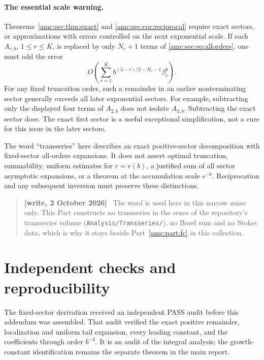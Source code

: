 \documentclass[11pt,letterpaper]{article}
\theoremstyle{remark}\newtheorem{remark}[theorem]{Remark}
\newenvironment{writenote}{\par\smallskip\begin{quote}\small\textbf{[write, 2 October 2026]}\ }{\end{quote}\smallskip}
\newcommand{\repopath}[1]{\nolinkurl{#1}}
\begin{document}
\paragraph{The essential scale warning.}
Theorems~\ref{amc:sec:thm:exact} and \ref{amc:sec:cor:reciprocal} require exact sectors, or approximations with errors controlled on the next exponential scale. If each $A_{r,b}$, $1\le r\le K$, is replaced by only $N_r+1$ terms of \eqref{amc:sec:eq:allorders}, one must add the error
\begin{equation}\label{amc:sec:eq:truncation}
 O\!\left(\sum_{r=1}^K
       b^{(3-r)/2-N_r-1}\beta_r^b\right).
\end{equation}
For any fixed truncation order, such a remainder in an earlier nonterminating sector generally exceeds all later exponential sectors. For example, subtracting only the displayed four terms of $A_{2,b}$ does not isolate $A_{3,b}$. Subtracting the exact sector does. The exact first sector is a useful exceptional simplification, not a cure for this issue in the later sectors.

The word ``transseries'' here describes an exact positive-sector decomposition with fixed-sector all-orders expansions. It does not assert optimal truncation, summability, uniform estimates for $r=r(b)$, a justified sum of all sector asymptotic expansions, or a theorem at the accumulation scale $e^{-b}$. Reciprocation and any subsequent inversion must preserve these distinctions.
\begin{writenote}
The word is used here in this narrow sense only. This Part constructs no transseries in the sense of the repository's transseries volume (\repopath{Analysis/Transseries/}), no Borel sum and no Stokes data, which is why it stays beside Part~\ref{amc:part:fc} in this collection.
\end{writenote}

\section{Independent checks and reproducibility}\label{amc:sec:sec:checks}
The fixed-sector derivation \cite{source} received an independent PASS audit \cite{audit} before this addendum was assembled. That audit verified the exact positive remainder, localization and uniform tail expansion, every leading constant, and the coefficients through order $b^{-3}$. It is an audit of the integral analysis; the growth-constant identification remains the separate theorem in the main report.
\end{document}
